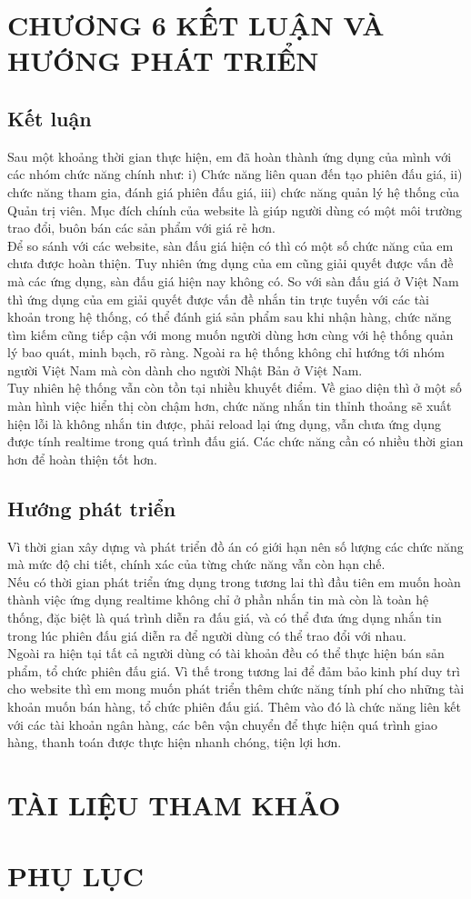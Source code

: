 \documentclass{article}
\begin{document}
\section*{CHƯƠNG 6 KẾT LUẬN VÀ HƯỚNG PHÁT TRIỂN}
\setcounter{section}{6}
\setcounter{subsection}{0}
\subsection{Kết luận}
Sau một khoảng thời gian thực hiện, em đã hoàn thành ứng dụng của mình với các nhóm chức năng chính như: i) Chức năng liên quan đến tạo phiên đấu giá, ii) chức năng tham gia, đánh giá phiên đấu giá, iii) chức năng quản lý hệ thống của Quản trị viên. Mục đích chính của website là giúp người dùng có một môi trường trao đổi, buôn bán các sản phẩm với giá rẻ hơn. \\
Để so sánh với các website, sàn đấu giá hiện có thì có một số chức năng của em chưa được hoàn thiện. Tuy nhiên ứng dụng của em cũng giải quyết được vấn đề mà các ứng dụng, sàn đấu giá hiện nay không có. So với sàn đấu giá ở Việt Nam thì ứng dụng của em giải quyết được vấn đề nhắn tin trực tuyến với các tài khoản trong hệ thống, có thể đánh giá sản phẩm sau khi nhận hàng, chức năng tìm kiếm cũng tiếp cận với mong muốn người dùng hơn cùng với hệ thống quản lý bao quát, minh bạch, rõ ràng. Ngoài ra hệ thống không chỉ hướng tới nhóm người Việt Nam mà còn dành cho người Nhật Bản ở Việt Nam.\\
Tuy nhiên hệ thống vẫn còn tồn tại nhiều khuyết điểm. Về giao diện thì ở một số màn hình việc hiển thị còn chậm hơn, chức năng nhắn tin thỉnh thoảng sẽ xuất hiện lỗi là không nhắn tin được, phải reload lại ứng dụng, vẫn chưa ứng dụng được tính realtime trong quá trình đấu giá. Các chức năng cần có nhiều thời gian hơn để hoàn thiện tốt hơn.
\subsection{Hướng phát triển}
Vì thời gian xây dựng và phát triển đồ án có giới hạn nên số lượng các chức năng mà mức độ chi tiết, chính xác của từng chức năng vẫn còn hạn chế. \\
Nếu có thời gian phát triển ứng dụng trong tương lai thì đầu tiên em muốn hoàn thành việc ứng dụng realtime không chỉ ở phần nhắn tin mà còn là toàn hệ thống, đặc biệt là quá trình diễn ra đấu giá, và có thể đưa ứng dụng nhắn tin trong lúc phiên đấu giá diễn ra để người dùng có thể trao đổi với nhau. \\
Ngoài ra hiện tại tất cả người dùng có tài khoản đều có thể thực hiện bán sản phẩm, tổ chức phiên đấu giá. Vì thế trong tương lai để đảm bảo kinh phí duy trì cho website thì em mong muốn phát triển thêm chức năng tính phí cho những tài khoản muốn bán hàng, tổ chức phiên đấu giá. Thêm vào đó là chức năng liên kết với các tài khoản ngân hàng, các bên vận chuyển để thực hiện quá trình giao hàng, thanh toán được thực hiện nhanh chóng, tiện lợi hơn. 
\newpage
\section*{TÀI LIỆU THAM KHẢO}
\newpage
\section*{PHỤ LỤC}
\end{document}
